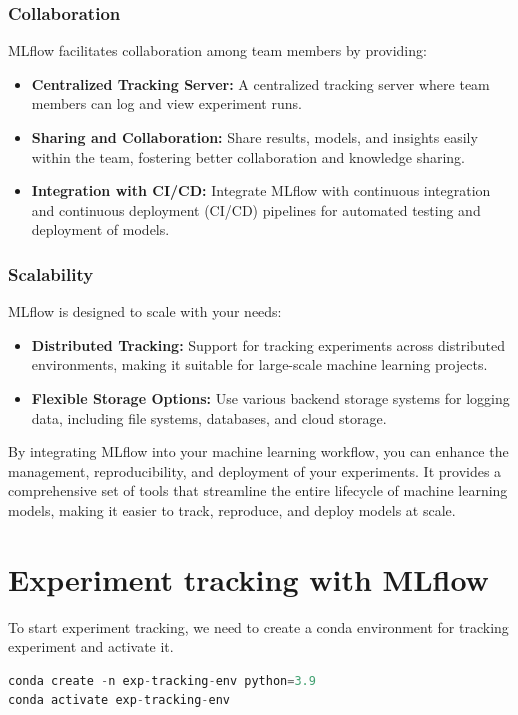 \documentclass[letterpaper,12pt,notitlepage,twoside]{report}
\begin{document}
\subsubsection{Collaboration}
MLflow facilitates collaboration among team members by providing:

\begin{itemize}
    \item \textbf{Centralized Tracking Server:} A centralized tracking server where team members can log and view experiment runs.
    \item \textbf{Sharing and Collaboration:} Share results, models, and insights easily within the team, fostering better collaboration and knowledge sharing.
    \item \textbf{Integration with CI/CD:} Integrate MLflow with continuous integration and continuous deployment (CI/CD) pipelines for automated testing and deployment of models.
\end{itemize}

\subsubsection{Scalability}
MLflow is designed to scale with your needs:

\begin{itemize}
    \item \textbf{Distributed Tracking:} Support for tracking experiments across distributed environments, making it suitable for large-scale machine learning projects.
    \item \textbf{Flexible Storage Options:} Use various backend storage systems for logging data, including file systems, databases, and cloud storage.
\end{itemize}

By integrating MLflow into your machine learning workflow, you can enhance the management, reproducibility, and deployment of your experiments. It provides a comprehensive set of tools that streamline the entire lifecycle of machine learning models, making it easier to track, reproduce, and deploy models at scale.


\section{Experiment tracking with MLflow}
To start experiment tracking, we need to create a conda environment for tracking experiment and activate it.
\begin{lstlisting}[language=python, numbers=none]
conda create -n exp-tracking-env python=3.9
conda activate exp-tracking-env
\end{lstlisting}
\end{document}
